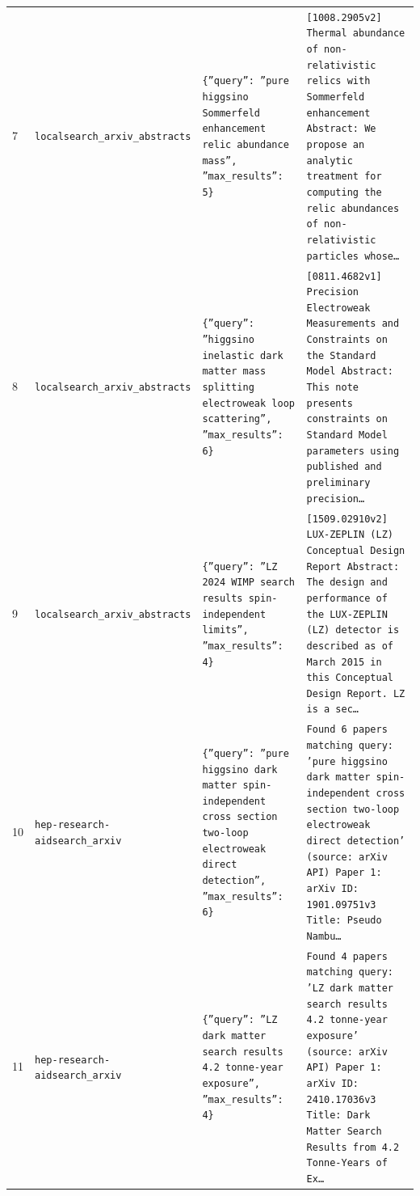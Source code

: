 \documentclass[11pt,a4paper]{article}
\begin{document}
\begin{longtable}{@{}p{}p{}p{}p{}@{}}
7 & \texttt{local}\newline\texttt{search\_\allowbreak{}arxiv\_\allowbreak{}abstracts} & \texttt{\{''query'':\allowbreak{} ''pure higgsino Sommerfeld enhancement relic abundance mass'',\allowbreak{} ''max\_\allowbreak{}results'':\allowbreak{} 5\}\allowbreak{}} & \texttt{[1008.2905v2]\allowbreak{} Thermal abundance of non-relativistic relics with Sommerfeld enhancement Abstract:\allowbreak{} We propose an analytic treatment for computing the relic abundances of non-relativistic particles whose\ldots{}\allowbreak{}} \\
8 & \texttt{local}\newline\texttt{search\_\allowbreak{}arxiv\_\allowbreak{}abstracts} & \texttt{\{''query'':\allowbreak{} ''higgsino inelastic dark matter mass splitting electroweak loop scattering'',\allowbreak{} ''max\_\allowbreak{}results'':\allowbreak{} 6\}\allowbreak{}} & \texttt{[0811.4682v1]\allowbreak{} Precision Electroweak Measurements and Constraints on the Standard Model Abstract:\allowbreak{}   This note presents constraints on Standard Model parameters using published and preliminary precision\ldots{}\allowbreak{}} \\
9 & \texttt{local}\newline\texttt{search\_\allowbreak{}arxiv\_\allowbreak{}abstracts} & \texttt{\{''query'':\allowbreak{} ''LZ 2024 WIMP search results spin-independent limits'',\allowbreak{} ''max\_\allowbreak{}results'':\allowbreak{} 4\}\allowbreak{}} & \texttt{[1509.02910v2]\allowbreak{} LUX-ZEPLIN (LZ)\allowbreak{} Conceptual Design Report Abstract:\allowbreak{} The design and performance of the LUX-ZEPLIN (LZ)\allowbreak{} detector is described as of March 2015 in this Conceptual Design Report. LZ is a sec\ldots{}\allowbreak{}} \\
10 & \texttt{hep-research-aid}\newline\texttt{search\_\allowbreak{}arxiv} & \texttt{\{''query'':\allowbreak{} ''pure higgsino dark matter spin-independent cross section two-loop electroweak direct detection'',\allowbreak{} ''max\_\allowbreak{}results'':\allowbreak{} 6\}\allowbreak{}} & \texttt{Found 6 papers matching query:\allowbreak{} 'pure higgsino dark matter spin-independent cross section two-loop electroweak direct detection' (source:\allowbreak{} arXiv API)\allowbreak{}  Paper 1:\allowbreak{} arXiv ID:\allowbreak{} 1901.09751v3 Title:\allowbreak{} Pseudo Nambu\ldots{}\allowbreak{}} \\
11 & \texttt{hep-research-aid}\newline\texttt{search\_\allowbreak{}arxiv} & \texttt{\{''query'':\allowbreak{} ''LZ dark matter search results 4.2 tonne-year exposure'',\allowbreak{} ''max\_\allowbreak{}results'':\allowbreak{} 4\}\allowbreak{}} & \texttt{Found 4 papers matching query:\allowbreak{} 'LZ dark matter search results 4.2 tonne-year exposure' (source:\allowbreak{} arXiv API)\allowbreak{}  Paper 1:\allowbreak{} arXiv ID:\allowbreak{} 2410.17036v3 Title:\allowbreak{} Dark Matter Search Results from 4.2 Tonne-Years of Ex\ldots{}\allowbreak{}} \\

\end{longtable}
\end{document}
